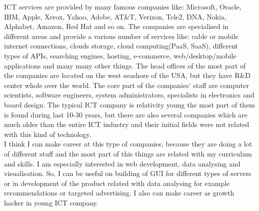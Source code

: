 \documentclass[english]{article}
\date{}
\begin{document}
ICT services are provided by many famous companies like: Microsoft, Oracle, IBM, Apple, Xerox, Yahoo, Adobe, AT\&T, Verizon, Tele2, DNA, Nokia, Alphabet, Amazon, Red Hat and so on. The companies are specialised in different areas and provide a various number of services like: cable or mobile internet connections, clouds storage, cloud computing(PaaS, SaaS), different types of APIs, searching engines, hosting, e-commerce, web/desktop/mobile applications and many many other things. The head offices of the most part of the companies are located on the west seashore of the USA, but they have R\&D center whole over the world. The core part of the companies` staff are computer scientists, software engineers, system administrators, specialists in electronics and board design. The typical ICT company is relativity young the most part of them is found during last 10-30 years, but there are also several companies which are much older than the entire ICT industry and their initial fields were not related with this kind of technology.\\

I think I can make career at this type of companies, because they are doing a lot of different stuff and the most part of this things are related with my curriculum and skills. I am especially interested in web development, data analysing and visualisation. So, I can be useful on building of GUI for different types of servers or in development of the product related with data analysing for example recommendations or targeted advertising. I also can make career as growth hacker in young ICT company.
\end{document}
